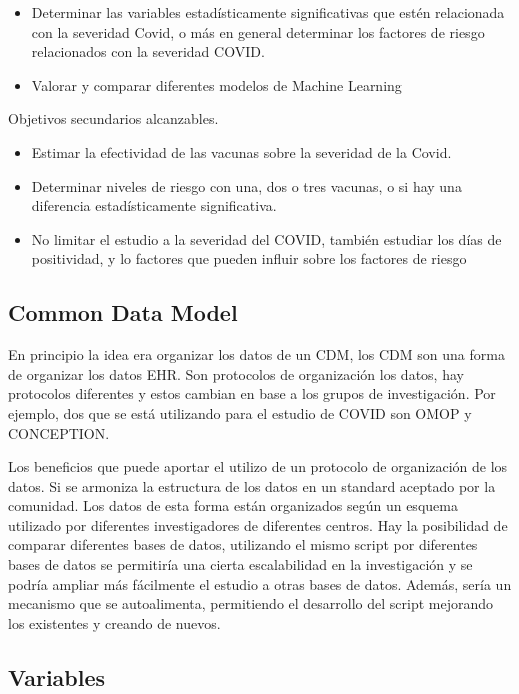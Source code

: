 \documentclass[
]{article}
\begin{document}
\begin{itemize}
\item
  Determinar las variables estadísticamente significativas que estén
  relacionada con la severidad Covid, o más en general determinar los
  factores de riesgo relacionados con la severidad COVID.
\item
  Valorar y comparar diferentes modelos de Machine Learning
\end{itemize}

Objetivos secundarios alcanzables.

\begin{itemize}
\item
  Estimar la efectividad de las vacunas sobre la severidad de la Covid.
\item
  Determinar niveles de riesgo con una, dos o tres vacunas, o si hay una
  diferencia estadísticamente significativa.
\item
  No limitar el estudio a la severidad del COVID, también estudiar los
  días de positividad, y lo factores que pueden influir sobre los
  factores de riesgo
\end{itemize}

\hypertarget{common-data-model}{%
\subsection{Common Data Model}\label{common-data-model}}

En principio la idea era organizar los datos de un CDM, los CDM son una
forma de organizar los datos EHR. Son protocolos de organización los
datos, hay protocolos diferentes y estos cambian en base a los grupos de
investigación. Por ejemplo, dos que se está utilizando para el estudio
de COVID son OMOP y CONCEPTION.

Los beneficios que puede aportar el utilizo de un protocolo de
organización de los datos. Si se armoniza la estructura de los datos en
un standard aceptado por la comunidad. Los datos de esta forma están
organizados según un esquema utilizado por diferentes investigadores de
diferentes centros. Hay la posibilidad de comparar diferentes bases de
datos, utilizando el mismo script por diferentes bases de datos se
permitiría una cierta escalabilidad en la investigación y se podría
ampliar más fácilmente el estudio a otras bases de datos. Además, sería
un mecanismo que se autoalimenta, permitiendo el desarrollo del script
mejorando los existentes y creando de nuevos.

\hypertarget{variables}{%
\subsection{Variables}\label{variables}}
\end{document}

